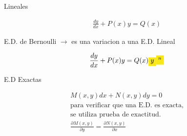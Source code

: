 \documentclass{article}
\begin{document}
Lineales


\begin{gather*}
\frac{dy}{dx}+P(x)y =Q(x)  
\end{gather*}


E.D. de Bernoulli $\rightarrow$  es una variacion a una E.D. Lineal


\begin{gather*}
\frac{dy}{dx}+P(x)y =Q(x)\text{\colorbox[RGB]{248,231,28}{$y$}}\text{\colorbox[RGB]{248,231,28}{$^{n}$}}
\end{gather*}




E.D Exactas


\begin{gather*}
M(x,y)dx + N(x,y)dy = 0 \\
\text{para verificar que una E.D. es exacta,} \\
\text{se utiliza prueba de exactitud.} \\
\frac{\partial M(x,y)}{\partial y} = \frac{\partial N(x,y)}{\partial x}
\end{gather*}
\end{document}
